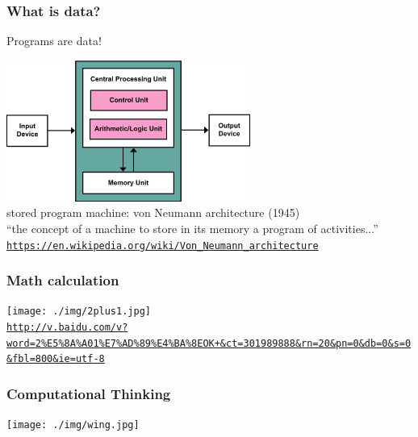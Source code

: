 \documentclass[11pt]{beamer}
\begin{document}
\begin{frame}
  \frametitle{What is data?}
  \Enlarge

  \begin{itemize}
      \myitem Programs are data! \pause
  \end{itemize}
  \begin{center}
  \includegraphics[width=0.6\textwidth]{./img/Von_Neumann.png}\\
  stored program machine: von Neumann architecture (1945)\\
  \textcolor{\CSGradBot}{``the concept of a machine to store in its memory a program of activities...''}
  \textcolor{\CSBase}{\small \texttt{\url{https://en.wikipedia.org/wiki/Von_Neumann_architecture}}}
  \end{center}
\end{frame}

\begin{frame}[fragile]
	\frametitle{Math calculation}
	\centering
	\texttt{[image: ./img/2plus1.jpg]}\\
	\textcolor{\CSBase}{\small \texttt{\url{http://v.baidu.com/v?word=2\%E5\%8A\%A01\%E7\%AD\%89\%E4\%BA\%8EOK+\&ct=301989888\&rn=20\&pn=0\&db=0\&s=0\&fbl=800\&ie=utf-8}}}
\end{frame}


\begin{frame}
	\frametitle{Computational Thinking}
	\Enlarge
	
	\texttt{[image: ./img/wing.jpg]}
\end{frame}
\end{document}
